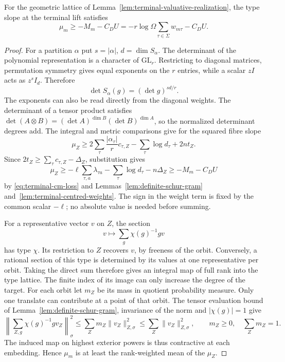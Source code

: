 \begin{auxlemma}\label{lem:terminal-cm-type-slope}
For the geometric lattice of Lemma~\ref{lem:terminal-valuative-realization}, the type slope at the terminal lift satisfies
\[
 \mu_m\ge-M_m-C_D U
       =-r\log\Omega\sum_{\tau\in\Sigma}w_{m\tau}-C_D U .
\]
\end{auxlemma}
\begin{proof}
For a partition \(\alpha\) put \(s=|\alpha|\), \(d=\dim S_\alpha\). The determinant of the polynomial representation is a character of \(\mathrm{GL}_r\). Restricting to diagonal matrices, permutation symmetry gives equal exponents on the \(r\) entries, while a scalar \(zI\) acts as \(z^s I_d\). Therefore
\[
 \det S_\alpha(g)=(\det g)^{sd/r}.
\]
The exponents can also be read directly from the diagonal weights. The determinant of a tensor product satisfies \(\det(A\otimes B)=(\det A)^{\dim B}(\det B)^{\dim A}\), so the normalized determinant degrees add. The integral and metric comparisons give for the squared fibre slope
\[
 \mu_Z\ge 2\sum_\tau\frac{|\alpha_\tau|}{r}c_{\tau,Z}
                       -\sum_\tau\log d_\tau+2nt_Z.
\]
Since \(2t_Z\ge\sum_\tau c_{\tau,Z}-\Delta_Z\), substitution gives
\[
 \mu_Z\ge-\ell\sum_{\tau,a}\lambda_{\tau a}
                      -\sum_\tau\log d_\tau-n\Delta_Z
             \ge-M_m-C_D U
\]
by \eqref{eq:terminal-cm-loss} and Lemmas~\ref{lem:definite-schur-gram} and~\ref{lem:terminal-centred-weights}. The sign in the weight term is fixed by the common scalar \(-\ell\); no absolute value is needed before summing.

For a representative vector \(v\) on \(Z\), the section
\[
             v\longmapsto\sum_{g}\chi(g)^{-1}g v
\]
has type \(\chi\). Its restriction to \(Z\) recovers \(v\), by freeness of the orbit. Conversely, a rational section of this type is determined by its values at one representative per orbit. Taking the direct sum therefore gives an integral map of full rank into the type lattice. The finite index of its image can only increase the degree of the target. For each orbit let \(m_Z\) be its mass in quotient probability measure. Only one translate can contribute at a point of that orbit. The tensor evaluation bound of Lemma~\ref{lem:definite-schur-gram}, invariance of the norm and \(|\chi(g)|=1\) give
\[
 \left\|\sum_{Z,g}\chi(g)^{-1}g v_Z\right\|_\sigma^2
    \le\sum_Z m_Z\|v_Z\|_{Z,\sigma}^2
    \le\sum_Z\|v_Z\|_{Z,\sigma}^2 ,
 \qquad m_Z\ge0,\quad\sum_Zm_Z=1 .
\]
The induced map on highest exterior powers is thus contractive at each embedding. Hence \(\mu_m\) is at least the rank-weighted mean of the \(\mu_Z\).
\end{proof}

